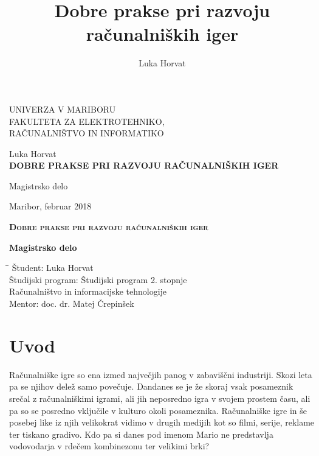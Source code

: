 \documentclass[12pt,a4paper,twoside]{book}
\author{Luka Horvat}
\title{Dobre prakse pri razvoju računalniških iger}
\begin{document}
	
\thispagestyle{empty} 

\begin{center}
{\large 
UNIVERZA V MARIBORU\\
FAKULTETA ZA ELEKTROTEHNIKO,\\
RAČUNALNIŠTVO IN INFORMATIKO\\
}

\vspace{\fill}
{\LARGE Luka Horvat}\\

\vspace{1cm}
\textsc{\textbf{\LARGE
		DOBRE PRAKSE PRI RAZVOJU RAČUNALNIŠKIH IGER\\
	}}

\vspace{1cm}
{\LARGE Magistrsko delo}

\vfill
{\Large Maribor, februar 2018}
\newpage
\end{center}

\begin{center}	
\vspace*{\fill}
\textsc{\textbf{\LARGE
		Dobre prakse pri razvoju računalniških iger\\
	}}
{\large\textbf{Magistrsko delo\\}
	
}
\vspace{\fill}
\begin{tabbing}
\hspace*{4cm}\=\hspace*{3cm}\= \kill
Študent: \> Luka Horvat\\
Študijski program: \> Študijski program 2. stopnje\\
\>Računalništvo in informacijske tehnologije\\
Mentor: \> doc. dr. Matej Črepinšek
\end{tabbing}
\end{center}
\newpage

\tableofcontents

\chapter{Uvod}
Računalniške igre so ena izmed največjih panog v zabaviščni industriji. Skozi leta pa se njihov delež samo povečuje. Dandanes se je že skoraj vsak posameznik srečal z računalniškimi igrami, ali jih neposredno igra v svojem prostem času, ali pa so se posredno vključile v kulturo okoli posameznika. Računalniške igre in še posebej like iz njih velikokrat vidimo v drugih medijih kot so filmi, serije, reklame ter tiskano gradivo. Kdo pa si danes pod imenom Mario ne predstavlja vodovodarja v rdečem kombinezonu ter velikimi brki?
\end{document}

